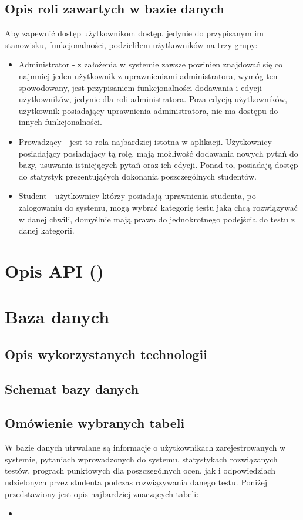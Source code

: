 \documentclass[a4paper, titlepage]{article}
\begin{document}
				\subsection{Opis roli zawartych w bazie danych}
				Aby zapewnić dostęp użytkownikom dostęp, jedynie do przypisanym im stanowisku, funkcjonalności, podzieliłem użytkowników na trzy grupy:
	\begin{itemize}
	\item Administrator - z założenia w systemie zawsze powinien znajdować się co najmniej jeden użytkownik z uprawnieniami administratora, wymóg ten spowodowany, jest przypisaniem funkcjonalności dodawania i edycji użytkowników, jedynie dla roli administratora. Poza edycją użytkowników, użytkownik posiadający uprawnienia administratora, nie ma dostępu do innych funkcjonalności.
	\item Prowadzący - jest to rola najbardziej istotna w aplikacji. Użytkownicy posiadający posiadający tą rolę, mają możliwość dodawania nowych pytań do bazy, usuwania istniejących pytań oraz ich edycji. Ponad to, posiadają dostęp do statystyk prezentująćych dokonania poszczególnych studentów. 
	\item Student - użytkownicy którzy posiadają uprawnienia studenta, po zalogowaniu do systemu, mogą wybrać kategorię testu jaką chcą rozwiązywać w danej chwili, domyślnie mają prawo do jednokrotnego podejścia do testu z danej kategorii.
    \end{itemize}

				\section{Opis API ()}				

				\section{Baza danych}
				\subsection{Opis wykorzystanych technologii}
				\subsection{Schemat bazy danych}
				\subsection{Omówienie wybranych tabeli}
				W bazie danych utrwalane są informacje o użytkownikach zarejestrowanych w systemie, pytaniach wprowadzonych do systemu, statystykach rozwiązanych testów, prograch punktowych dla poszczególnych ocen, jak i odpowiedziach udzielonych przez studenta podczas rozwiązywania danego testu. Poniżej przedstawiony jest opis najbardziej znaczących tabeli:
				\begin{itemize}
					\item 
                \end{itemize}
\end{document}
